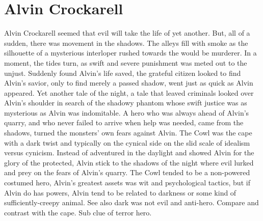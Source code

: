 \documentclass[12pt]{book}
\begin{document}
\chapter{Alvin Crockarell}

Alvin Crockarell seemed that evil will take the life of yet another. But, all of a sudden, there was movement in the shadows. The alleys fill with smoke as the silhouette of a mysterious interloper rushed towards the would be murderer. In a moment, the tides turn, as swift and severe punishment was meted out to the unjust. Suddenly found Alvin's life saved, the grateful citizen looked to find Alvin's savior, only to find merely a passed shadow, went just as quick as Alvin appeared. Yet another tale of the night, a tale that leaved criminals looked over Alvin's shoulder in search of the shadowy phantom whose swift justice was as mysterious as Alvin was indomitable. A hero who was always ahead of Alvin's quarry, and who never failed to arrive when help was needed, came from the shadows, turned the monsters' own fears against Alvin. The Cowl was the cape with a dark twist and typically on the cynical side on the slid scale of idealism versus cynicism. Instead of adventured in the daylight and showed Alvin for the glory of the protected, Alvin stick to the shadows of the night where evil lurked and prey on the fears of Alvin's quarry. The Cowl tended to be a non-powered costumed hero, Alvin's greatest assets was wit and psychological tactics, but if Alvin do has powers, Alvin tend to be related to darkness or some kind of sufficiently-creepy animal. See also dark was not evil and anti-hero. Compare and contrast with the cape. Sub clue of terror hero.
\end{document}
